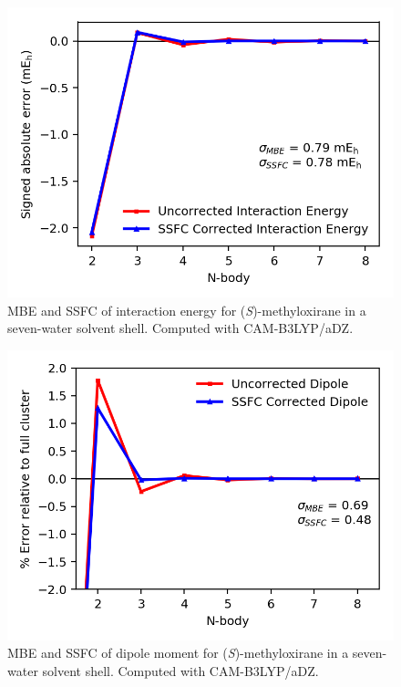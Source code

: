     \begin{figure}
        \centering
        \includegraphics[scale=0.75]{p1/graphs/si/metox_7_cam_int.png}
        \caption{MBE and SSFC of interaction energy for (\textit{S})-methyloxirane in a seven-water solvent shell. Computed with CAM-B3LYP/aDZ.}
        \label{metox_7_cam_int}
    \end{figure}
    \begin{figure}
        \centering
        \includegraphics[scale=0.75]{p1/graphs/si/metox_7_cam_dip.png}
        \caption{MBE and SSFC of dipole moment for (\textit{S})-methyloxirane in a seven-water solvent shell. Computed with CAM-B3LYP/aDZ.}
        \label{metox_7_cam_dip}
    \end{figure}
